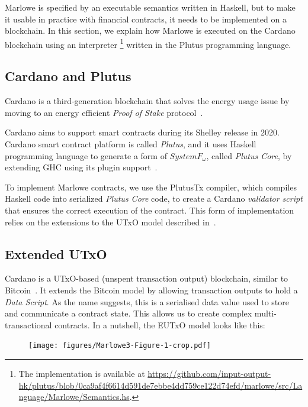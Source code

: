 \documentclass[runningheads]{llncs}
\begin{document}
Marlowe is specified by an executable semantics written in Haskell, but to make it usable in practice with financial contracts, it needs to be implemented on a blockchain. In this section, we explain how Marlowe is executed on the Cardano blockchain using an interpreter \footnote{The implementation is available at \url{https://github.com/input-output-hk/plutus/blob/0ca9af4f6614d591de7ebbe4dd759ce122d74efd/marlowe/src/Language/Marlowe/Semantics.hs}.} written in the Plutus programming language.

\subsection{Cardano and Plutus}

Cardano is a third-generation blockchain that solves the energy usage
issue by moving to an energy efficient \emph{Proof of Stake} protocol~\cite{Ouroboros-Genesis}.

Cardano aims to support smart contracts during its Shelley release in 2020.
Cardano smart contract platform is called \emph{Plutus}, and
it uses Haskell programming language to generate a form of $System F_{\omega}$,
called \emph{Plutus Core}, by extending GHC using its plugin
support~\cite[Section 13.3]{ghcusersguide}.

To implement Marlowe contracts, we use the PlutusTx compiler,
which compiles Haskell code into serialized \emph{Plutus Core} code,
to create a Cardano \emph{validator script} that ensures the correct execution of the contract.
This form of implementation relies on the extensions to the UTxO model described in~\cite{PlutusPlatform}.


\subsection{Extended UTxO}

Cardano is a UTxO-based (unspent transaction output) blockchain, similar to Bitcoin~\cite{sok}.
It extends the Bitcoin model by allowing transaction outputs to hold a \emph{Data Script}.
As the name suggests, this is  a serialised data value used to store and communicate a contract state.
This allows us to create complex multi-transactional contracts.
In a nutshell, the EUTxO model looks like this:

\begin{figure}[!h]
    \centering
    \texttt{[image: figures/Marlowe3-Figure-1-crop.pdf]}
\end{figure}
\end{document}
